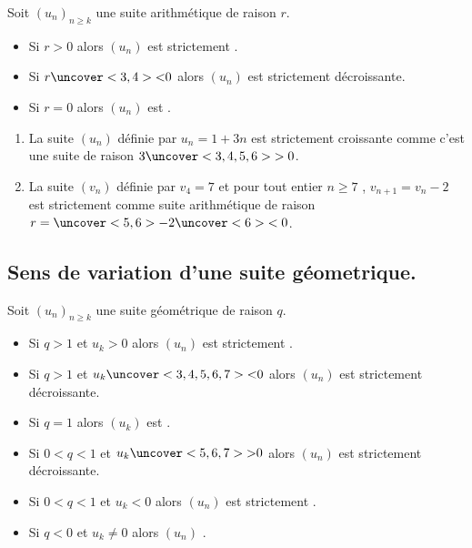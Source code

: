 \documentclass{beamer}
\begin{document}
 \begin{frame}
 \begin{theorem}
  Soit $(u_n)_{n \geq k}$ une suite arithmétique de raison $r$.
  \begin{itemize}
   \item Si $r >0$ alors $(u_n)$ est strictement .
   \item Si $r \uncover<3,4>{<} 0$ alors $(u_n)$ est strictement décroissante.
   \item Si $r=0$ alors $(u_n)$ est .
  \end{itemize}
 \end{theorem}
 \end{frame}
 
 \begin{frame}
 \begin{example}
    
    \begin{enumerate}
     \item La suite $(u_n)$ définie par $u_n=1+3n$ est strictement croissante comme 
     c'est une suite  de raison $3\uncover<3,4,5,6>{>0}$.
     \item La suite $(v_n)$ définie par $v_4=7$ et pour tout entier $n \geq 7$
     , $v_{n+1}=v_n -2$ est strictement  comme suite arithmétique
     de raison $r=\uncover<5,6>{-2}\uncover<6>{<0}$.
    \end{enumerate}
 \end{example}
 \end{frame}
 
    \subsection{Sens de variation d'une suite géometrique.}

 \begin{frame}
 \begin{theorem}
  Soit $(u_n)_{n \geq k}$ une suite géométrique de raison $q$.
  \begin{itemize}
   \item Si $q > 1$ et $u_k>0$ alors $(u_n)$ est strictement .
   \item Si $q > 1$ et $u_k\uncover<3,4,5,6,7>{<}0$ alors $(u_n)$ est strictement décroissante.
   \item Si $q = 1$ alors $(u_k)$ est .
   \item Si $0 < q < 1$ et $u_k\uncover<5,6,7>{>}0$ alors $(u_n)$ est strictement décroissante.
   \item Si $0 < q < 1$ et $u_k<0$ alors $(u_n)$ est strictement .
   \item Si $q < 0$ et $u_k \neq 0$ alors $(u_n)$ .
  \end{itemize}
 \end{theorem}
 \end{frame}
 
\end{document}

